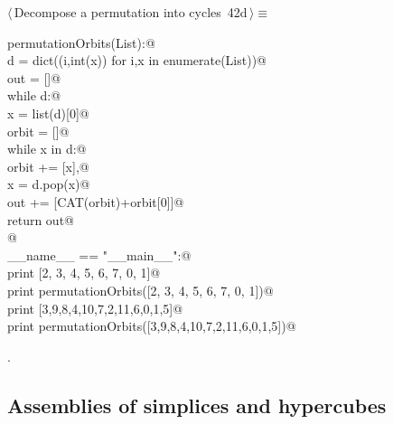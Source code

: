 \documentclass[11pt,oneside]{article}	%
\begin{document}
\begin{flushleft} \small \label{scrap92}
\protect{}$\langle\,$Decompose a permutation into cycles\nobreak\ {\footnotesize 42d}$\,\rangle\equiv$
\vspace{-1ex}
\begin{list}{}{} \item
\mbox{}\verb@def permutationOrbits(List):@\\
\mbox{}\verb@   d = dict((i,int(x)) for i,x in enumerate(List))@\\
\mbox{}\verb@   out = []@\\
\mbox{}\verb@   while d:@\\
\mbox{}\verb@      x = list(d)[0]@\\
\mbox{}\verb@      orbit = []@\\
\mbox{}\verb@      while x in d:@\\
\mbox{}\verb@         orbit += [x],@\\
\mbox{}\verb@         x = d.pop(x)@\\
\mbox{}\verb@      out += [CAT(orbit)+orbit[0]]@\\
\mbox{}\verb@   return out@\\
\mbox{}\verb@      @\\
\mbox{}\verb@if __name__ == "__main__":@\\
\mbox{}\verb@   print [2, 3, 4, 5, 6, 7, 0, 1]@\\
\mbox{}\verb@   print permutationOrbits([2, 3, 4, 5, 6, 7, 0, 1])@\\
\mbox{}\verb@   print [3,9,8,4,10,7,2,11,6,0,1,5]@\\
\mbox{}\verb@   print permutationOrbits([3,9,8,4,10,7,2,11,6,0,1,5])@\\
\mbox{}\verb@@{\NWsep}
\end{list}
\vspace{-1ex}
\footnotesize\addtolength{\baselineskip}{-1ex}
\begin{list}{}{\setlength{\itemsep}{-\parsep}\setlength{\itemindent}{-\leftmargin}}
\item {\NWtxtMacroNoRef}.
\end{list}
\end{flushleft}

\subsection{Assemblies of simplices and hypercubes}
\end{document}
